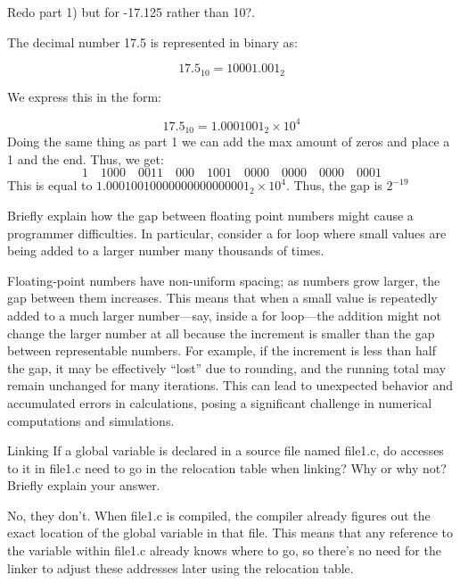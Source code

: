 \documentclass[12pt, letterpaper]{article}
\begin{document}
\begin{subproblem}{}
    Redo part 1) but for -17.125 rather than 10?.
\end{subproblem}
The decimal number 17.5 is represented in binary as:

\[
17.5_{10} = 10001.001_2
\]

We express this in the form:

\[
17.5_{10} = 1.0001001_2 \times 10^4
\]
Doing the same thing as part 1 we can add the max amount of zeros and place a 1 and the end.
Thus, we get:
\[1 \quad 1000 \quad 0011 \quad 000 \quad 1001 \quad 0000 \quad 0000 \quad 0000 \quad 0001\]
This is equal to $1.00010010000000000000001_2 \times 10^4$. Thus, the gap is $2^{-19}$

\begin{subproblem}{}
    Briefly explain how the gap between floating point numbers might cause a programmer
    difficulties. In particular, consider a for loop where small values are being added to a larger number many thousands of times.
\end{subproblem}
Floating-point numbers have non-uniform spacing; as numbers grow larger, the gap between them increases. This means that when a small value is repeatedly added to a much larger number—say, inside a for loop—the addition might not change the larger number at all because the increment is smaller than the gap between representable numbers. For example, if the increment is less than half the gap, it may be effectively “lost” due to rounding, and the running total may remain unchanged for many iterations. This can lead to unexpected behavior and accumulated errors in calculations, posing a significant challenge in numerical computations and simulations.

\begin{problem}{Linking}
    If a global variable is declared in a source file named file1.c, do accesses to it in file1.c need to go
in the relocation table when linking? Why or why not? Briefly explain your answer.
\end{problem}
No, they don't. When file1.c is compiled, the compiler already figures out the exact location of the global variable in that file. 
This means that any reference to the variable within file1.c already knows where to go, so there's no need for the linker to adjust these addresses later using the relocation table.
\end{document}
